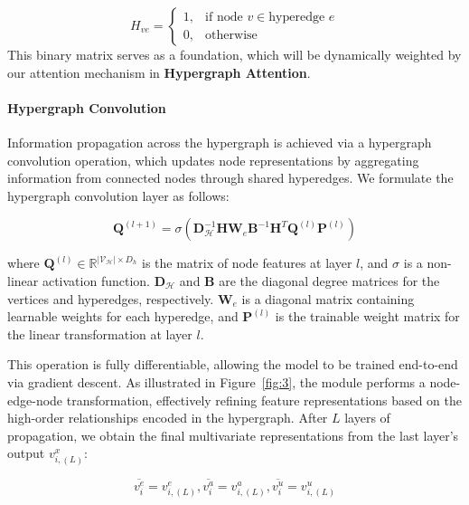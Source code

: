 \documentclass[runningheads]{llncs}
\begin{document}
\begin{equation}\label{eq:e4}
	H_{ve} = 
	\begin{cases}
		1, & \text{if node } v \in \text{hyperedge } e \\
		0, & \text{otherwise}
	\end{cases}
\end{equation}
This binary matrix serves as a foundation, which will be dynamically weighted by our attention mechanism in \textbf{Hypergraph Attention}.


\paragraph{\textbf{Hypergraph Convolution}}
Information propagation across the hypergraph is achieved via a hypergraph convolution operation, which updates node representations by aggregating information from connected nodes through shared hyperedges. We formulate the hypergraph convolution layer as follows:

\begin{equation}\label{eq:e5}
	\mathbf{Q}^{(l+1)} = \sigma(\mathbf{D}_{\mathcal{H}}^{-1}\mathbf{H}\mathbf{W}_{e}\mathbf{B}^{-1}\mathbf{H}^T\mathbf{Q}^{(l)}\mathbf{P}^{(l)})
\end{equation}

\noindent where $\mathbf{Q}^{(l)} \in \mathbb{R}^{|\mathcal{V}_{\mathcal{H}}|\times D_h}$ is the matrix of node features at layer $l$, and $\sigma$ is a non-linear activation function. $\mathbf{D}_{\mathcal{H}}$ and $\mathbf{B}$ are the diagonal degree matrices for the vertices and hyperedges, respectively. $\mathbf{W}_{e}$ is a diagonal matrix containing learnable weights for each hyperedge, and $\mathbf{P}^{(l)}$ is the trainable weight matrix for the linear transformation at layer $l$.

This operation is fully differentiable, allowing the model to be trained end-to-end via gradient descent. As illustrated in Figure~\ref{fig:3}, the module performs a node-edge-node transformation, effectively refining feature representations based on the high-order relationships encoded in the hypergraph. After $L$ layers of propagation, we obtain the final multivariate representations from the last layer's output $v_{i,(L)}^x$:

\begin{equation}\label{eq:e6}
	\overline{v_{i}^e}=v_{i,(L)}^e, \overline{v_{i}^a}=v_{i,(L)}^a, \overline{v_{i}^u}=v_{i,(L)}^u
\end{equation}
\end{document}
